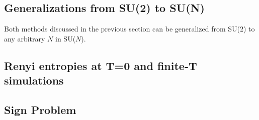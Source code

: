 \documentclass[aps,prb,groupedaddress,twocolumn]{revtex4}
\begin{document}
\subsection {Generalizations from SU(2) to SU(N)}
\label{ss:su2N}

Both methods discussed in the previous section can be generalized from
SU($2$) to any arbitrary $N$ in SU($N$). 

\subsection{Renyi entropies at T=0 and finite-T simulations}

\subsection{Sign Problem}
\label{ss:sign}
\end{document}
